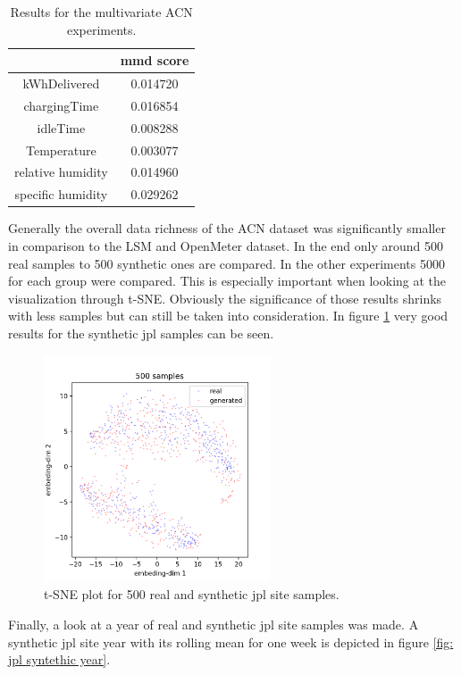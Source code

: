 \begin{table}[h!]
    \centering
    \begin{tabular}{|c | c  |}
        \hline
         &mmd score\\
        \hline\hline
         kWhDelivered&0.014720\\
         chargingTime&0.016854\\
         idleTime&0.008288\\ 
         Temperature&0.003077\\
         relative humidity&0.014960\\
         specific humidity&0.029262 \\
        \hline
    \end{tabular}
    \caption{Results for the multivariate ACN experiments.}
    \label{table:om results}
\end{table}%
Generally the overall data richness of the ACN dataset was significantly smaller in comparison to the LSM and OpenMeter dataset. In the end only around 500 real samples to 500 synthetic ones are compared. In the other experiments 5000 for each group were compared. This is especially important when looking at the visualization through t-SNE. Obviously the significance of those results shrinks with less samples but can still be taken into consideration. In figure \ref{fig:tsne jpl} very good results for the synthetic jpl samples can be seen.
\begin{figure}[h!]
    \centering
    \includegraphics[width=0.6\textwidth]{images/jpl_tsne_res.png}
    \caption{t-SNE plot for 500 real and synthetic jpl site samples.}
    \label{fig:tsne jpl}
\end{figure}\newline \noindent
Finally, a look at a year of real and synthetic jpl site samples was made. A synthetic jpl site year with its rolling mean for one week is depicted in figure \ref{fig: jpl syntethic year}.

